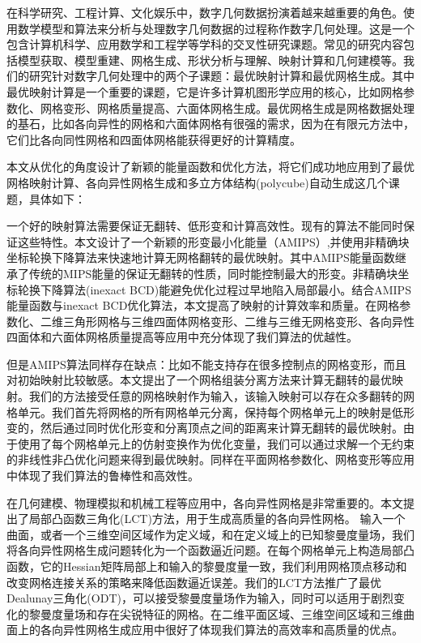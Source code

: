 ﻿\begin{cnabstract}
在科学研究、工程计算、文化娱乐中，数字几何数据扮演着越来越重要的角色。使用数学模型和算法来分析与处理数字几何数据的过程称作数字几何处理。这是一个包含计算机科学、应用数学和工程学等学科的交叉性研究课题。常见的研究内容包括模型获取、模型重建、网格生成、形状分析与理解、映射计算和几何建模等。我们的研究针对数字几何处理中的两个子课题：最优映射计算和最优网格生成。其中最优映射计算是一个重要的课题，它是许多计算机图形学应用的核心，比如网格参数化、网格变形、网格质量提高、六面体网格生成。最优网格生成是网格数据处理的基石，比如各向异性的网格和六面体网格有很强的需求，因为在有限元方法中，它们比各向同性网格和四面体网格能获得更好的计算精度。

本文从优化的角度设计了新颖的能量函数和优化方法，将它们成功地应用到了最优网格映射计算、各向异性网格生成和多立方体结构(polycube)自动生成这几个课题，具体如下：

一个好的映射算法需要保证无翻转、低形变和计算高效性。现有的算法不能同时保证这些特性。本文设计了一个新颖的形变最小化能量（AMIPS）,并使用非精确块坐标轮换下降算法来快速地计算无网格翻转的最优映射。其中AMIPS能量函数继承了传统的MIPS能量的保证无翻转的性质，同时能控制最大的形变。非精确块坐标轮换下降算法(inexact BCD)能避免优化过程过早地陷入局部最小。结合AMIPS能量函数与inexact BCD优化算法，本文提高了映射的计算效率和质量。在网格参数化、二维三角形网格与三维四面体网格变形、二维与三维无网格变形、各向异性四面体和六面体网格质量提高等应用中充分体现了我们算法的优越性。

但是AMIPS算法同样存在缺点：比如不能支持存在很多控制点的网格变形，而且对初始映射比较敏感。本文提出了一个网格组装分离方法来计算无翻转的最优映射。我们的方法接受任意的网格映射作为输入，该输入映射可以存在众多翻转的网格单元。我们首先将网格的所有网格单元分离，保持每个网格单元上的映射是低形变的，然后通过同时优化形变和分离顶点之间的距离来计算无翻转的最优映射。由于使用了每个网格单元上的仿射变换作为优化变量，我们可以通过求解一个无约束的非线性非凸优化问题来得到最优映射。同样在平面网格参数化、网格变形等应用中体现了我们算法的鲁棒性和高效性。

在几何建模、物理模拟和机械工程等应用中，各向异性网格是非常重要的。本文提出了局部凸函数三角化(LCT)方法，用于生成高质量的各向异性网格。 输入一个曲面，或者一个三维空间区域作为定义域，和在定义域上的已知黎曼度量场，我们将各向异性网格生成问题转化为一个函数逼近问题。在每个网格单元上构造局部凸函数，它的Hessian矩阵局部上和输入的黎曼度量一致，我们利用网格顶点移动和改变网格连接关系的策略来降低函数逼近误差。我们的LCT方法推广了最优Dealunay三角化(ODT)，可以接受黎曼度量场作为输入，同时可以适用于剧烈变化的黎曼度量场和存在尖锐特征的网格。在二维平面区域、三维空间区域和三维曲面上的各向异性网格生成应用中很好了体现我们算法的高效率和高质量的优点。


\end{cnabstract}
